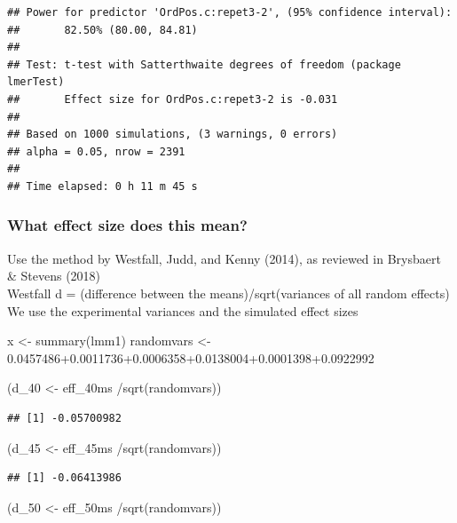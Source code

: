 \documentclass[
]{article}
\newenvironment{Shaded}{\begin{snugshade}}{\end{snugshade}}
\newcommand{\FloatTok}[1]{\textcolor[rgb]{0.00,0.00,0.81}{#1}}
\newcommand{\FunctionTok}[1]{\textcolor[rgb]{0.00,0.00,0.00}{#1}}
\newcommand{\NormalTok}[1]{#1}
\newcommand{\OtherTok}[1]{\textcolor[rgb]{0.56,0.35,0.01}{#1}}
\newcommand{\SpecialCharTok}[1]{\textcolor[rgb]{0.00,0.00,0.00}{#1}}
\begin{document}
\begin{verbatim}
## Power for predictor 'OrdPos.c:repet3-2', (95% confidence interval):
##       82.50% (80.00, 84.81)
## 
## Test: t-test with Satterthwaite degrees of freedom (package lmerTest)
##       Effect size for OrdPos.c:repet3-2 is -0.031
## 
## Based on 1000 simulations, (3 warnings, 0 errors)
## alpha = 0.05, nrow = 2391
## 
## Time elapsed: 0 h 11 m 45 s
\end{verbatim}

\hypertarget{what-effect-size-does-this-mean}{%
\subsubsection{What effect size does this
mean?}\label{what-effect-size-does-this-mean}}

Use the method by Westfall, Judd, and Kenny (2014), as reviewed in
Brysbaert \& Stevens (2018)\\
Westfall d = (difference between the means)/sqrt(variances of all random
effects)\\
We use the experimental variances and the simulated effect sizes

\begin{Shaded}
\begin{Highlighting}[]
\NormalTok{x }\OtherTok{\textless{}{-}} \FunctionTok{summary}\NormalTok{(lmm1)}
\NormalTok{randomvars }\OtherTok{\textless{}{-}}  \FloatTok{0.0457486+0.0011736+0.0006358+0.0138004+0.0001398+0.0922992}

\NormalTok{(d\_40 }\OtherTok{\textless{}{-}}\NormalTok{ eff\_40ms }\SpecialCharTok{/}\FunctionTok{sqrt}\NormalTok{(randomvars))}
\end{Highlighting}
\end{Shaded}

\begin{verbatim}
## [1] -0.05700982
\end{verbatim}

\begin{Shaded}
\begin{Highlighting}[]
\NormalTok{(d\_45 }\OtherTok{\textless{}{-}}\NormalTok{ eff\_45ms }\SpecialCharTok{/}\FunctionTok{sqrt}\NormalTok{(randomvars))}
\end{Highlighting}
\end{Shaded}

\begin{verbatim}
## [1] -0.06413986
\end{verbatim}

\begin{Shaded}
\begin{Highlighting}[]
\NormalTok{(d\_50 }\OtherTok{\textless{}{-}}\NormalTok{ eff\_50ms }\SpecialCharTok{/}\FunctionTok{sqrt}\NormalTok{(randomvars))}
\end{Highlighting}
\end{Shaded}
\end{document}
